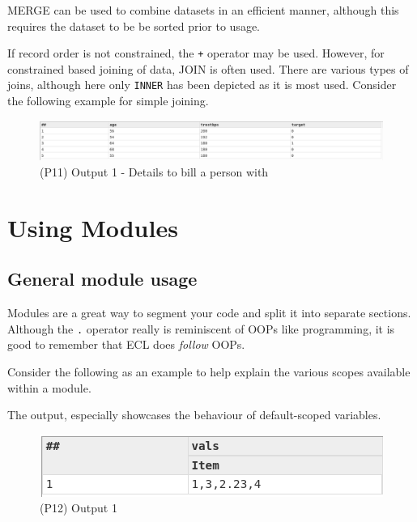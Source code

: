 \documentclass[a4paper,oneside,12pt]{book}
\begin{document}
MERGE can be used to combine datasets in an efficient manner, although this requires the dataset to be be sorted prior to usage. 


If record order is not constrained, the \lstinline{+} operator may be used. 
However, for constrained based joining of data, JOIN is often used. There are various types of joins, although here only \lstinline{INNER} has been depicted as it is most used. Consider the following example for simple joining.



\begin{figure}[h]
    \centering
    \includegraphics[width=.92\linewidth]{../output/63/3}
    \caption{(P11) Output 1 - Details to bill a person with}
\end{figure}


\chapter{Using Modules}
\section{General module usage}
Modules are a great way to segment your code and split it into separate sections.
Although the \lstinline!.! operator really is reminiscent of OOPs like programming, it is good to remember that ECL does \textit{follow} OOPs.

Consider the following as an example to help explain the various scopes available within a module.




The output, especially showcases the behaviour of default-scoped variables.
\begin{figure}[h]
    \centering
    \includegraphics[width=.6\linewidth]{../output/75/1}
    \caption{(P12) Output 1}
\end{figure}
\end{document}
